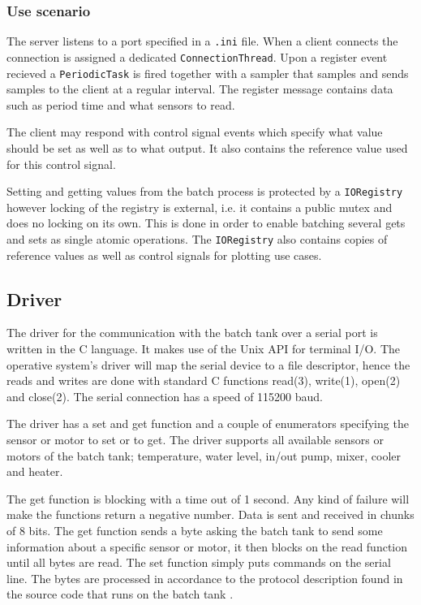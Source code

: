 \documentclass{article}
\begin{document}
\subsubsection{Use scenario}
The server listens to a port specified in a \verb+.ini+ file. When a client
connects the connection is assigned a dedicated \verb+ConnectionThread+. 
Upon a register event recieved a \verb+PeriodicTask+ is fired together
with a sampler that samples and sends samples to the client at a regular
interval. The register message contains data such as period time and
what sensors to read.

The client may respond with control signal events which specify what
value should be set as well as to what output. It also contains the
reference value used for this control signal.

Setting and getting values from the batch process is protected by a
\verb+IORegistry+ however locking of the registry is external, i.e. it
contains a public mutex and does no locking on its own. This is done in
order to enable batching several gets and sets as single atomic
operations. The \verb+IORegistry+ also contains copies of reference
values as well as control signals for plotting use cases.


\subsection{Driver}
The driver for the communication with the batch tank over a serial port is written in the C language.
It makes use of the Unix API for terminal I/O. The operative system's driver will
map the serial device to a file descriptor, hence the reads and writes are done
with standard C functions read(3), write(1), open(2) and close(2).  The serial
connection has a speed of 115200 baud. 

The driver has a set and get function and a couple of enumerators specifying the
sensor or motor to set or to get. The driver supports all available sensors or motors of
the batch tank; temperature, water level, in/out pump, mixer, cooler and heater.

The get function is blocking with a time out of 1 second. Any kind of failure will
make the functions return a negative number. Data is sent and received in chunks
of 8 bits. The get function sends a byte asking the batch tank to send some
information about a specific sensor or motor, it then blocks on the read function
until all bytes are read. The set function simply puts commands on the serial
line. The bytes are processed in accordance to the protocol description found in the source code that runs on the
batch tank \cite[line 150-223]{kokare.c}. 
\end{document}
